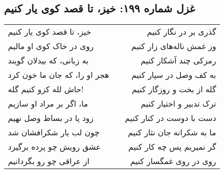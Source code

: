 \begin{center}
\section*{غزل شماره ۱۹۹: خیز، تا قصد کوی یار کنیم}
\label{sec:199}
\begin{longtable}{l p{0.5cm} r}
خیز، تا قصد کوی یار کنیم
&&
گذری بر در نگار کنیم
\\
روی در خاک کوی او مالیم
&&
وز غمش ناله‌های زار کنیم
\\
به زبانی، که بیدلان گویند
&&
رمزکی چند آشکار کنیم
\\
هجر او را، که جان ما خون کرد
&&
به کف وصل در سپار کنیم
\\
حاش لله کزو کنیم گله!
&&
گله از بخت و روزگار کنیم
\\
ما، اگر بر مراد او سازیم
&&
ترک تدبیر و اختیار کنیم
\\
زود پا در بساط وصل نهیم
&&
دست با دوست در کنار کنیم
\\
چون لب یار شکرافشان شد
&&
ما به شکرانه جان نثار کنیم
\\
عشق رویش چو پرده برگیرد
&&
گر نمیریم پس چه کار کنیم
\\
از عراقی چو رو بگردانیم
&&
روی در روی غمگسار کنیم
\\
\end{longtable}
\end{center}
